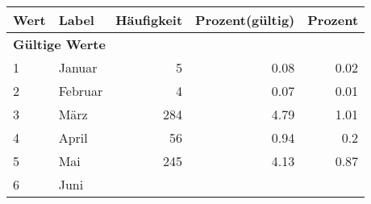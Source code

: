      \begin{longtable}{lXrrr}
     \toprule
     \textbf{Wert} & \textbf{Label} & \textbf{Häufigkeit} & \textbf{Prozent(gültig)} & \textbf{Prozent} \\
     \endhead
     \midrule
     \multicolumn{5}{l}{\textbf{Gültige Werte}}\\

     1 &
     \multicolumn{1}{X}{ Januar   } &


       \num{5} &
       \num[round-mode=places,round-precision=2]{0,08} &
         \num[round-mode=places,round-precision=2]{0,02} \\

     2 &
     \multicolumn{1}{X}{ Februar   } &


       \num{4} &
       \num[round-mode=places,round-precision=2]{0,07} &
         \num[round-mode=places,round-precision=2]{0,01} \\

     3 &
     \multicolumn{1}{X}{ März   } &


       \num{284} &
       \num[round-mode=places,round-precision=2]{4,79} &
         \num[round-mode=places,round-precision=2]{1,01} \\

     4 &
     \multicolumn{1}{X}{ April   } &


       \num{56} &
       \num[round-mode=places,round-precision=2]{0,94} &
         \num[round-mode=places,round-precision=2]{0,2} \\

     5 &
     \multicolumn{1}{X}{ Mai   } &


       \num{245} &
       \num[round-mode=places,round-precision=2]{4,13} &
         \num[round-mode=places,round-precision=2]{0,87} \\

     6 &
     \multicolumn{1}{X}{ Juni   } &



\end{longtable}
